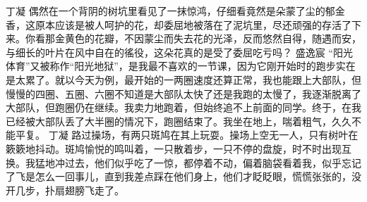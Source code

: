 {}\markdownRendererInterblockSeparator
{}丁凝\markdownRendererInterblockSeparator
{}偶然在一个背阴的树坑里看见了一抹惊鸿，仔细看竟然是朵蒙了尘的郁金香，这原本应该是被人呵护的花，却委屈地被落在了泥坑里，尽还顽强的存活了下来。你看那金黄色的花瓣，不因蒙尘而失去花的光泽，反而悠然自得，随遇而安，与细长的叶片在风中自在的徭役，这朵花真的是受了委屈吃亏吗？\markdownRendererInterblockSeparator
{}\markdownRendererInterblockSeparator
{}盛逸宸\markdownRendererInterblockSeparator
{}“阳光体育”又被称作“阳光地狱”，是我最不喜欢的一节课，因为它刚开始时的跑步实在是太累了。就以今天为例，最开始的一两圈速度还算正常，我也能跟上大部队，但慢慢的四圈、五圈、六圈\markdownRendererEllipsis{}\markdownRendererEllipsis{}不知道是大部队太快了还是我跑的太慢了，我逐渐脱离了大部队，但跑圈仍在继续。我卖力地跑着，但始终追不上前面的同学。终于，在我已经被大部队丢了大半圈的情况下，跑圈结束了。我坐在地上，喘着粗气，久久不能平复。\markdownRendererInterblockSeparator
{}\markdownRendererInterblockSeparator
{}丁凝\markdownRendererInterblockSeparator
{}路过操场，有两只斑鸠在其上玩耍。操场上空无一人，只有树叶在簌簌地抖动。斑鸠愉悦的鸣叫着，一只散着步，一只不停的盘旋，时不时出现互换。我猛地冲过去，他们似乎吃了一惊，都停着不动，偏着脑袋看着我，似乎忘记了飞是怎么一回事儿，直到我差点踩在他们身上，他们才眨眨眼，慌慌张张的，没开几步，扑扇翅膀飞走了。\markdownRendererDocumentEnd